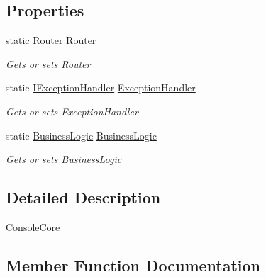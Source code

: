 \subsection*{Properties}
\begin{DoxyCompactItemize}
\item 
static \mbox{\hyperlink{class_gtd_app_1_1_logic_1_1_routing_1_1_router}{Router}} \mbox{\hyperlink{class_gtd_app_1_1_console_core_1_1_console_core_a2b8ade54798622cbd911fa709e120e61}{Router}}
\begin{DoxyCompactList}\small\item\em Gets or sets Router \end{DoxyCompactList}\item 
static \mbox{\hyperlink{interface_gtd_app_1_1_console_core_1_1_interfaces_1_1_i_exception_handler}{I\+Exception\+Handler}} \mbox{\hyperlink{class_gtd_app_1_1_console_core_1_1_console_core_ac8621f98353e70535e8125cf7397a9be}{Exception\+Handler}}
\begin{DoxyCompactList}\small\item\em Gets or sets Exception\+Handler \end{DoxyCompactList}\item 
static \mbox{\hyperlink{class_gtd_app_1_1_logic_1_1_business_logic}{Business\+Logic}} \mbox{\hyperlink{class_gtd_app_1_1_console_core_1_1_console_core_a3c80ecabba0d3990de44a411db8c5183}{Business\+Logic}}
\begin{DoxyCompactList}\small\item\em Gets or sets Business\+Logic \end{DoxyCompactList}\end{DoxyCompactItemize}


\subsection{Detailed Description}
\mbox{\hyperlink{class_gtd_app_1_1_console_core_1_1_console_core}{Console\+Core}} 



\subsection{Member Function Documentation}
\mbox{\label{class_gtd_app_1_1_console_core_1_1_console_core_a9605e55fa1a56275fd2d81fa5c628520}} 
